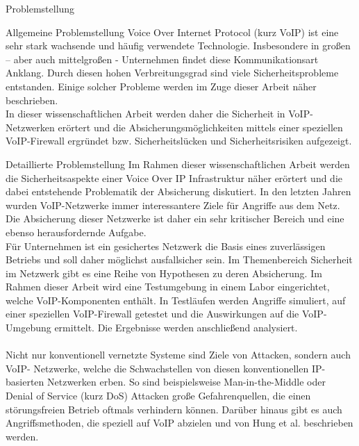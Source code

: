 \begin{section}{Problemstellung}
\begin{subsection}{Allgemeine Problemstellung}
Voice Over Internet Protocol (kurz VoIP) ist eine sehr stark wachsende und häufig verwendete Technologie. Insbesondere in großen – aber auch mittelgroßen - Unternehmen findet diese Kommunikationsart Anklang.
Durch diesen hohen Verbreitungsgrad sind viele Sicherheitsprobleme entstanden.
Einige solcher Probleme werden im Zuge dieser Arbeit näher beschrieben.
\\
In dieser wissenschaftlichen Arbeit werden daher die Sicherheit in VoIP-Netzwerken erörtert und die Absicherungsmöglichkeiten mittels einer speziellen VoIP-Firewall ergründet bzw. Sicherheitslücken und Sicherheitsrisiken aufgezeigt.
\end{subsection}
\begin{subsection}{Detaillierte Problemstellung}
Im Rahmen dieser wissenschaftlichen Arbeit werden die Sicherheitsaspekte einer Voice Over IP Infrastruktur näher erörtert und die dabei entstehende Problematik der Absicherung diskutiert.
In den letzten Jahren wurden VoIP-Netzwerke immer interessantere Ziele für Angriffe aus dem Netz. Die Absicherung dieser Netzwerke ist daher ein sehr kritischer Bereich und eine ebenso herausfordernde Aufgabe.
\\
Für Unternehmen ist ein gesichertes Netzwerk die Basis eines zuverlässigen Betriebs und soll daher möglichst ausfallsicher sein.
Im Themenbereich Sicherheit im Netzwerk gibt es eine Reihe von Hypothesen zu deren Absicherung. Im Rahmen dieser Arbeit wird eine Testumgebung in einem Labor eingerichtet, welche VoIP-Komponenten enthält. In Testläufen werden Angriffe simuliert, auf einer speziellen VoIP-Firewall getestet und die Auswirkungen auf die VoIP-Umgebung ermittelt.
Die Ergebnisse werden anschließend analysiert.
\\
\\
Nicht nur konventionell vernetzte Systeme sind Ziele von Attacken, sondern auch VoIP- Netzwerke, welche die Schwachstellen von diesen konventionellen IP-basierten Netzwerken erben.
So sind beispielsweise Man-in-the-Middle oder Denial of Service (kurz DoS) Attacken große Gefahrenquellen, die einen störungsfreien Betrieb oftmals verhindern können. Darüber hinaus gibt es auch Angriffsmethoden, die speziell auf VoIP abzielen und von Hung et al. beschrieben werden.
\cite{Hung:2006:seciss} \\ 
\end{subsection}
\end{section}
\pagebreak

